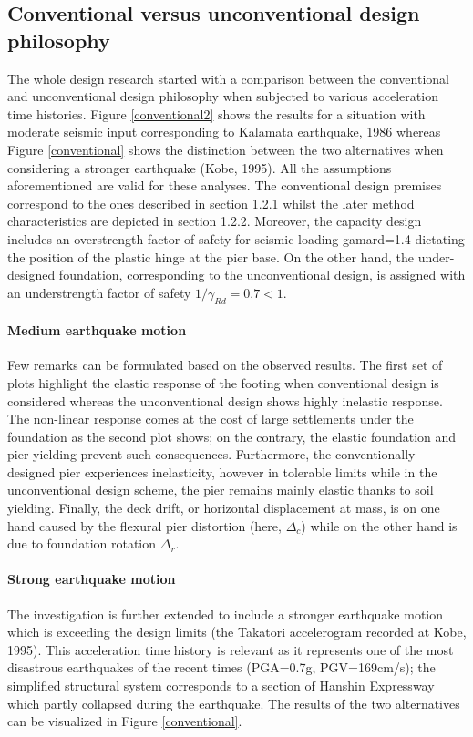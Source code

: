 \documentclass[11pt,a4paper]{report}
\begin{document}
\subsection{Conventional versus unconventional design philosophy}
The whole design research started with a comparison between the conventional and unconventional design philosophy when subjected to various acceleration time histories. Figure \ref{conventional2} shows the results for a situation with moderate seismic input corresponding to Kalamata earthquake, 1986 whereas Figure \ref{conventional} shows the distinction between the two alternatives when considering a stronger earthquake (Kobe, 1995). All the assumptions aforementioned are valid for these analyses. The conventional design premises correspond to the ones described in section 1.2.1 whilst the later method characteristics are depicted in section 1.2.2. Moreover, the capacity design includes an overstrength factor of safety for seismic loading \gls{gamard}=1.4 dictating the position of the plastic hinge at the pier base. On the other hand, the under-designed foundation, corresponding to the unconventional design, is assigned with an understrength factor of safety $1/\gamma_{Rd}=0.7 <1$. 


\paragraph{Medium earthquake motion}
Few remarks can be formulated based on the observed results. The first set of plots highlight the elastic response of the footing when conventional design is considered whereas the unconventional design shows highly inelastic response. The non-linear response comes at the cost of large settlements under the foundation as the second plot shows; on the contrary, the elastic foundation and pier yielding prevent such consequences. Furthermore, the conventionally designed pier experiences \mbox{inelasticity}, however in tolerable limits while in the unconventional design scheme, the pier remains mainly elastic thanks to soil yielding. Finally, the deck drift, or horizontal displacement at mass, is on one hand caused by the flexural pier distortion (here, $\Delta_c$) while on the other hand is due to foundation rotation $\Delta_r$. 

\paragraph{Strong earthquake motion}
The investigation is further extended to include a stronger earthquake motion which is exceeding the design limits (the Takatori accelerogram recorded at Kobe, 1995). This acceleration time history is relevant as it represents one of the most disastrous earthquakes of the recent times (PGA=0.7g, \gls{PGV}=169cm/s); the simplified structural system corresponds to a section of Hanshin Expressway which partly collapsed during the earthquake. The results of the two alternatives can be visualized in Figure \ref{conventional}.
\end{document}
